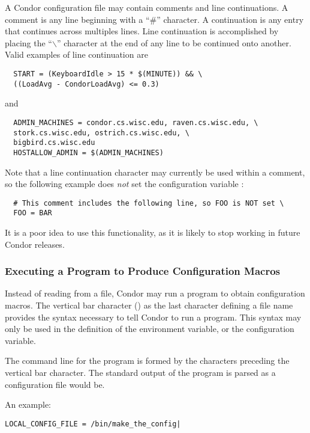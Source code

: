 A Condor configuration file may contain comments and
line continuations.
A comment is any line beginning with a ``\#'' character.
A continuation is any entry that continues across multiples lines.
Line continuation is accomplished by placing the ``$\backslash$''
character at the end of any line to be continued onto another.
Valid examples of line continuation are
\begin{verbatim}
  START = (KeyboardIdle > 15 * $(MINUTE)) && \
  ((LoadAvg - CondorLoadAvg) <= 0.3)
\end{verbatim}
and
\begin{verbatim}
  ADMIN_MACHINES = condor.cs.wisc.edu, raven.cs.wisc.edu, \
  stork.cs.wisc.edu, ostrich.cs.wisc.edu, \
  bigbird.cs.wisc.edu
  HOSTALLOW_ADMIN = $(ADMIN_MACHINES)
\end{verbatim}

Note that a line continuation character may currently be used within
a comment, so the following example does \emph{not} set the
configuration variable :
\begin{verbatim}
  # This comment includes the following line, so FOO is NOT set \
  FOO = BAR
\end{verbatim}
It is a poor idea to use this functionality, as it is likely to
stop working in future Condor releases.

\subsubsection{\label{sec:Program-Defined-Macros}Executing a Program to Produce Configuration Macros}

Instead of reading from a file,
Condor may run a program to obtain configuration macros.
The vertical bar character (\Bar) as the last character defining
a file name provides the syntax necessary to tell 
Condor to run a program.
This syntax may only be used in the definition of
the \Env{CONDOR\_CONFIG} environment variable,
or the \Macro{LOCAL\_CONFIG\_FILE} configuration variable.

The command line for the program 
is formed by the characters preceding the vertical bar character.
The standard output of the program is parsed as a configuration 
file would be.

An example:
\begin{verbatim}
LOCAL_CONFIG_FILE = /bin/make_the_config|
\end{verbatim}

